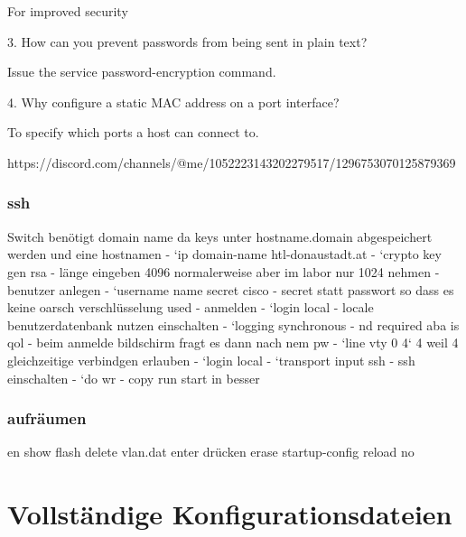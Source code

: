 \documentclass[a4paper]{article}
\begin{document}
For improved security

3. How can you prevent passwords from being sent in plain text?

Issue the service password-encryption command.

4. Why configure a static MAC address on a port interface?

To specify which ports a host can connect to.

https://discord.com/channels/@me/1052223143202279517/1296753070125879369
\newpage

\subsubsection{ssh}
Switch benötigt domain name da keys unter hostname.domain abgespeichert werden und eine hostnamen
- `ip domain-name htl-donaustadt.at
- `crypto key gen rsa
	- länge eingeben 4096 normalerweise aber im labor nur 1024 nehmen
- benutzer anlegen
	- `username name secret cisco
		- secret statt passwort so dass es keine oarsch verschlüsselung used
	- anmelden
		- `login local
			- locale benutzerdatenbank nutzen einschalten
		- `logging synchronous
			- nd required aba is qol
		- beim anmelde bildschirm fragt es dann nach nem pw
- `line vty 0 4` 4 weil 4 gleichzeitige verbindgen erlauben
	- `login local
	- `transport input ssh
		- ssh einschalten
	- `do wr
		- copy run start in besser

\subsubsection{aufräumen}

en
show flash
delete vlan.dat
enter drücken
erase startup-config
reload
no
\section{Vollständige Konfigurationsdateien}
\end{document}
